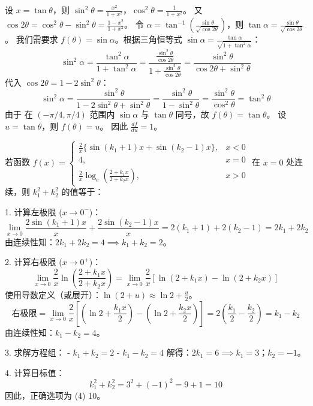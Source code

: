 \begin{questions}
\begin{solution}
设 $x = \tan \theta$，则 $\sin^{2} \theta = \frac{x^{2}}{1+x^{2}}$，$\cos^{2} \theta = \frac{1}{1+x^{2}}$。
又 $\cos 2\theta = \cos^{2} \theta - \sin^{2} \theta = \frac{1-x^{2}}{1+x^{2}}$。
令 $\alpha = \tan^{-1} \left( \frac{\sin \theta}{\sqrt{\cos 2\theta}} \right)$，则 $\tan \alpha = \frac{\sin \theta}{\sqrt{\cos 2\theta}}$。
我们需要求 $f(\theta) = \sin \alpha$。根据三角恒等式 $\sin \alpha = \frac{\tan \alpha}{\sqrt{1 + \tan^{2} \alpha}}$：
\[
\sin^{2} \alpha = \frac{\tan^{2} \alpha}{1 + \tan^{2} \alpha} = \frac{\frac{\sin^{2} \theta}{\cos 2\theta}}{1 + \frac{\sin^{2} \theta}{\cos 2\theta}} = \frac{\sin^{2} \theta}{\cos 2\theta + \sin^{2} \theta}
\]
代入 $\cos 2\theta = 1 - 2\sin^{2} \theta$：
\[
\sin^{2} \alpha = \frac{\sin^{2} \theta}{1 - 2\sin^{2} \theta + \sin^{2} \theta} = \frac{\sin^{2} \theta}{1 - \sin^{2} \theta} = \frac{\sin^{2} \theta}{\cos^{2} \theta} = \tan^{2} \theta
\]
由于 在 $(-\pi/4, \pi/4)$ 范围内 $\sin \alpha$ 与 $\tan \theta$ 同号，故 $f(\theta) = \tan \theta$。
设 $u = \tan \theta$，则 $f(\theta) = u$。
因此 $\frac{df}{du} = 1$。
\end{solution}

    \question 
若函数 $f(x) = \begin{cases} \frac{2}{x}\{\sin(k_1+1)x + \sin(k_2-1)x\}, & x < 0 \\ 4, & x = 0 \\ \frac{2}{x}\log_e(\frac{2+k_1 x}{2+k_2 x}), & x > 0 \end{cases}$
在 $x=0$ 处连续，则 $k_1^2 + k_2^2$ 的值等于：

\begin{solution}
1. 计算左极限 ($x \to 0^-$)：
\[ \lim_{x \to 0} \frac{2\sin(k_1+1)x}{x} + \frac{2\sin(k_2-1)x}{x} = 2(k_1+1) + 2(k_2-1) = 2k_1 + 2k_2 \]
由连续性知：$2k_1 + 2k_2 = 4 \implies k_1 + k_2 = 2$。

2. 计算右极限 ($x \to 0^+$)：
\[ \lim_{x \to 0} \frac{2}{x} \ln\left(\frac{2+k_1 x}{2+k_2 x}\right) = \lim_{x \to 0} \frac{2}{x} \left[ \ln(2+k_1 x) - \ln(2+k_2 x) \right] \]
使用导数定义（或展开）：$\ln(2+u) \approx \ln 2 + \frac{u}{2}$。
\[ \text{右极限} = \lim_{x \to 0} \frac{2}{x} \left[ (\ln 2 + \frac{k_1 x}{2}) - (\ln 2 + \frac{k_2 x}{2}) \right] = 2(\frac{k_1}{2} - \frac{k_2}{2}) = k_1 - k_2 \]
由连续性知：$k_1 - k_2 = 4$。

3. 求解方程组：
- $k_1 + k_2 = 2$
- $k_1 - k_2 = 4$
解得：$2k_1 = 6 \implies k_1 = 3$；$k_2 = -1$。

4. 计算目标值：
\[ k_1^2 + k_2^2 = 3^2 + (-1)^2 = 9 + 1 = 10 \]
因此，正确选项为 (4) 10。
\end{solution}


\end{questions}
